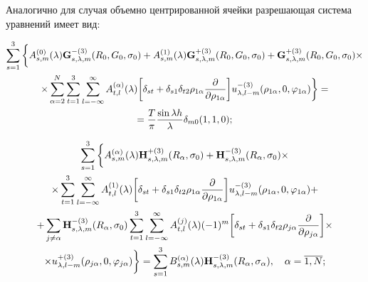 Аналогично для случая объемно центрированной ячейки разрешающая система уравнений имеет вид:

\begin{multline}
\sum\limits_{s = 1}^3 \bigg\{  A_{s,m}^{(0)}(\lambda ){\bf{G}}_{s,\lambda ,m}^{ - (3)}({R_0},{G_0},{\sigma _0}) + A_{s,m}^{(1)}(\lambda ){\bf{G}}_{s,\lambda ,m}^{ + (3)}({R_0},{G_0},{\sigma _0}) + {\bf{G}}_{s,\lambda ,m}^{ + (3)}({R_0},{G_0},{\sigma _0}) \times \\
\times \sum\limits_{\alpha  = 2}^N {\sum\limits_{t = 1}^3 {\sum\limits_{l =  - \infty }^\infty  {A_{t,l}^{(\alpha )}} } } (\lambda )\bigg[{\delta _{st}} + {\delta _{s1}}{\delta _{t2}}{\rho _{1\alpha }}\frac{\partial }{{\partial {\rho _{1\alpha }}}}\bigg]u_{\lambda ,l - m}^{ - (3)}({\rho _{1\alpha }},0,{\varphi _{1\alpha }})\bigg\}  = \\
= \frac{T}{\pi }\frac{{\sin \lambda h}}{\lambda }{\delta _{m0}}(1,1,0);
\end{multline}

\begin{multline}
\sum\limits_{s = 1}^3 \bigg\{  A_{s,m}^{(\alpha )}(\lambda ){\bf{H}}_{s,\lambda ,m}^{ + (3)}({R_\alpha },{\sigma _0}) + {\bf{H}}_{s,\lambda ,m}^{ - (3)}({R_\alpha },{\sigma _0}) \times \\
\times \sum\limits_{t = 1}^3 {\sum\limits_{l =  - \infty }^\infty  {A_{t,l}^{(1)}} } (\lambda )\bigg[{\delta _{st}} + {\delta _{s1}}{\delta _{t2}}{\rho _{1\alpha }}\frac{\partial }{{\partial {\rho _{1\alpha }}}}\bigg]u_{\lambda ,l - m}^{ - (3)}({\rho _{1\alpha }},0,{\varphi _{1\alpha }}) + \\
+ \sum\limits_{j \ne \alpha } {{\bf{H}}_{s,\lambda ,m}^{ - (3)}} ({R_\alpha },{\sigma _0})\sum\limits_{t = 1}^3 {\sum\limits_{l =  - \infty }^\infty  {A_{t,l}^{(j)}} } (\lambda ){( - 1)^m}\bigg[{\delta _{st}} + {\delta _{s1}}{\delta _{t2}}{\rho _{j\alpha }}\frac{\partial }{{\partial {\rho _{j\alpha }}}}\bigg] \times \\
\times u_{\lambda ,l - m}^{ + (3)}({\rho _{j\alpha }},0,{\varphi _{j\alpha }})\bigg\}  = \sum\limits_{s = 1}^3 {B_{s,m}^{(\alpha )}} (\lambda ){\bf{H}}_{s,\lambda ,m}^{ - (3)}({R_\alpha },{\sigma _\alpha }),\;\;\;{\mkern 1mu} {\kern 1pt} \alpha  = \overline {1,N};
\end{multline}

